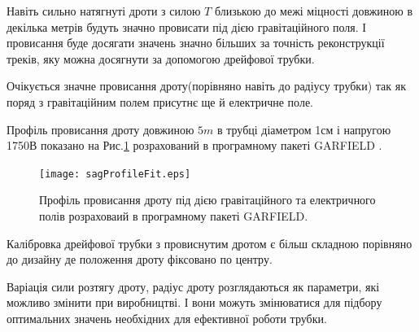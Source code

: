 	Навіть сильно натягнуті дроти з силою $T$ близькою до межі міцності довжиною в декілька метрів будуть значно провисати під дією гравітаційного поля. І провисання буде досягати значень значно більших за точність реконструкції треків, яку можна досягнути за допомогою дрейфової трубки.
	
	
	Очікується значне провисання дроту(порівняно навіть до радіусу трубки) так як поряд  з гравітаційним полем присутнє ще й електричне поле.
	

	Профіль провисання дроту довжиною $5m$ в трубці діаметром 1см і напругою 1750В показано на Рис.\ref{fig:sagProfile} розрахований в програмному пакеті GARFIELD \cite{garfield}.
		
	
	\begin{figure}[h!]
	\centering
	\texttt{[image: sagProfileFit.eps]}
	\caption{Профіль провисання дроту під дією гравітаційного та електричного полів розраховаий в програмному пакеті GARFIELD.}
	\label{fig:sagProfile}
	\end{figure}	
	
	Калібровка дрейфової трубки з провиснутим дротом є більш складною порівняно до дизайну де положення дроту фіксовано по центру.

	Варіація сили розтягу дроту, радіус дроту розглядаються як параметри, які можливо змінити при виробництві. І вони можуть змінюватися для підбору оптимальних значень необхідних для ефективної роботи трубки.
		
